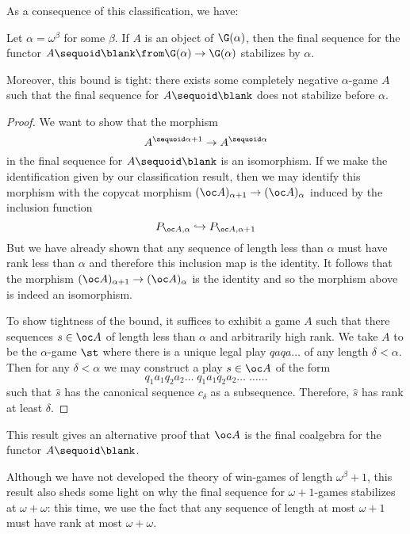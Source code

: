 \documentclass[11pt]{article} %
\begin{document}
As a consequence of this classification, we have:

\begin{corollary}
  Let $\alpha=\omega^\beta$ for some $\beta$.  If $A$ is an object of $\G(\alpha)$, then the final sequence for the functor $A\sequoid\blank\from\G(\alpha)\to\G(\alpha)$ stabilizes by $\alpha$.  

  Moreover, this bound is tight: there exists some completely negative $\alpha$-game $A$ such that the final sequence for $A\sequoid\blank$ does not stabilize before $\alpha$.  
  \begin{proof}
    We want to show that the morphism
    \[
      A^{\sequoid\alpha+1}\to A^{\sequoid\alpha}
      \]
    in the final sequence for $A\sequoid\blank$ is an isomorphism.  If we make the identification given by our classification result, then we may identify this morphism with the copycat morphism $(\oc A)_{\alpha+1}\to(\oc A)_\alpha$ induced by the inclusion function
    \[
      P_{\oc A,\alpha}\hookrightarrow P_{\oc A,\alpha+1}
      \]
    But we have already shown that any sequence of length less than $\alpha$ must have rank less than $\alpha$ and therefore this inclusion map is the identity.  It follows that the morphism $(\oc A)_{\alpha+1}\to(\oc A)_\alpha$ is the identity and so the morphism above is indeed an isomorphism.

    To show tightness of the bound, it suffices to exhibit a game $A$ such that there sequences $s\in\oc A$ of length less than $\alpha$ and arbitrarily high rank.  We take $A$ to be the $\alpha$-game $\st$ where there is a unique legal play $qaqa\dots$ of any length $\delta<\alpha$.  Then for any $\delta<\alpha$ we may construct a play $s\in\oc A$ of the form
    \[
      q_1a_1q_2a_2\dots\;q_1a_1q_2a_2\dots\;\dots\dots
      \]
    such that $\hat{s}$ has the canonical sequence $c_{\delta}$ as a subsequence.  Therefore, $\hat{s}$ has rank at least $\delta$.  
  \end{proof}
\end{corollary}

\begin{note}
  This result gives an alternative proof that $\oc A$ is the final coalgebra for the functor $A\sequoid\blank$.  

  Although we have not developed the theory of win-games of length $\omega^\beta+1$, this result also sheds some light on why the final sequence for $\omega+1$-games stabilizes at $\omega+\omega$: this time, we use the fact that any sequence of length at most $\omega+1$ must have rank at most $\omega+\omega$.  
\end{note}
\end{document}
